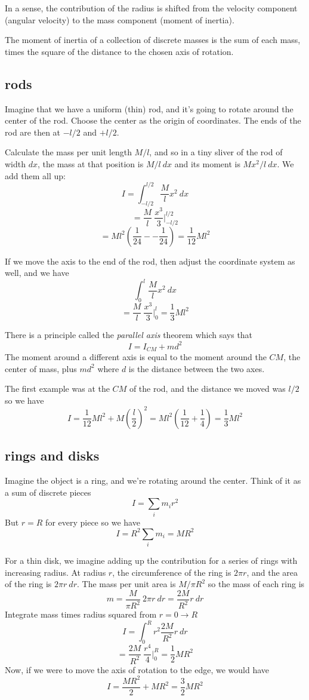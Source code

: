 \documentclass[11pt, oneside]{article}
\begin{document}
In a sense, the contribution of the radius is shifted from the velocity component (angular velocity) to the mass component (moment of inertia).

The moment of inertia of a collection of discrete masses is the sum of each mass, times the square of the distance to the chosen axis of rotation.  

\subsection*{rods}
Imagine that we have a uniform (thin) rod, and it's going to rotate around the center of the rod.  Choose the center as the origin of coordinates.  The ends of the rod are then at $-l/2$ and $+l/2$.

Calculate the mass per unit length $M/l$, and so in a tiny sliver of the rod of width $dx$, the mass at that position is $M/l \ dx$ and its moment is $Mx^2/l \ dx$.  We add them all up:
\[ I = \int_{-l/2}^{l/2} \frac{M}{l} x^2 \ dx \]
\[ =  \frac{M}{l} \ \frac{x^3}{3} \bigg |_{-l/2}^{l/2} \]
\[ = Ml^2 (\frac{1}{24} - - \frac{1}{24}) = \frac{1}{12} Ml^2 \]

If we move the axis to the end of the rod, then adjust the coordinate system as well, and we have
\[ \int_0^l \frac{M}{l} x^2 \ dx \]
\[ =  \frac{M}{l} \ \frac{x^3}{3} \bigg |_{0}^{l} = \frac{1}{3} Ml^2 \]  

There is a principle called the \emph{parallel axis} theorem which says that 
\[ I = I_{CM} + md^2 \]
The moment around a different axis is equal to the moment around the $CM$, the center of mass, plus $md^2$ where $d$ is the distance between the two axes.  

The first example was at the $CM$ of the rod, and the distance we moved was $l/2$ so we have
\[ I = \frac{1}{12} Ml^2 + M (\frac{l}{2})^2 = Ml^2 (\frac{1}{12} + \frac{1}{4}) = \frac{1}{3} Ml^2 \]

\subsection*{rings and disks}
Imagine the object is a ring, and we're rotating around the center.  Think of it as a sum of discrete pieces
\[ I = \sum_i m_i r^2 \]
But $r = R$ for every piece so we have
\[ I = R^2 \sum_i m_i = MR^2 \]

For a thin disk, we imagine adding up the contribution for a series of rings with increasing radius.  At radius $r$, the circumference of the ring is $2 \pi r$, and the area of the ring is $2 \pi r \ dr$.  The mass per unit area is $M/\pi R^2$ so the mass of each ring is
\[ m = \frac{M}{\pi R^2} \ 2 \pi r \ dr = \frac{2M}{R^2} r \ dr \]
Integrate mass times radius squared from $r=0 \rightarrow R$
\[ I = \int_0^R r^2 \frac{2M}{R^2} r \ dr \]
\[ = \frac{2M}{R^2} \ \frac{r^4}{4} \bigg |_{0}^{R} =  \frac{1}{2} MR^2 \]
Now, if we were to move the axis of rotation to the edge, we would have
\[ I = \frac{MR^2}{2} + MR^2 = \frac{3}{2} MR^2 \]
\end{document}

